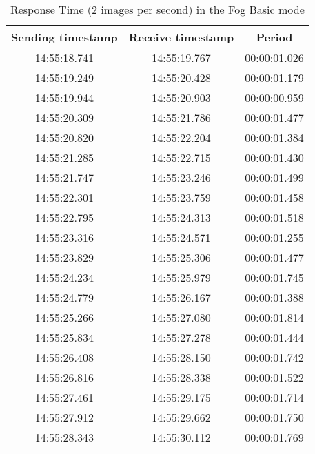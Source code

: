 \begin{table}[h!]
\centering
\begin{tabular}{ |c|c|c| } 
 \hline
 Sending timestamp &    Receive timestamp &    Period\\
 \hline

14:55:18.741 &	14:55:19.767 &	00:00:01.026 \\
14:55:19.249 &	14:55:20.428 &	00:00:01.179 \\
14:55:19.944 &	14:55:20.903 &	00:00:00.959 \\
14:55:20.309 &	14:55:21.786 &	00:00:01.477 \\
14:55:20.820 &	14:55:22.204 &	00:00:01.384 \\
14:55:21.285 &	14:55:22.715 &	00:00:01.430 \\
14:55:21.747 &	14:55:23.246 &	00:00:01.499 \\
14:55:22.301 &	14:55:23.759 &	00:00:01.458 \\
14:55:22.795 &	14:55:24.313 &	00:00:01.518 \\
14:55:23.316 &	14:55:24.571 &	00:00:01.255 \\
14:55:23.829 &	14:55:25.306 &	00:00:01.477 \\
14:55:24.234 &	14:55:25.979 &	00:00:01.745 \\
14:55:24.779 &	14:55:26.167 &	00:00:01.388 \\
14:55:25.266 &	14:55:27.080 &	00:00:01.814 \\
14:55:25.834 &	14:55:27.278 &	00:00:01.444 \\
14:55:26.408 &	14:55:28.150 &	00:00:01.742 \\
14:55:26.816 &	14:55:28.338 &	00:00:01.522 \\
14:55:27.461 &	14:55:29.175 &	00:00:01.714 \\
14:55:27.912 &	14:55:29.662 &	00:00:01.750 \\
14:55:28.343 &	14:55:30.112 &	00:00:01.769 \\
 \hline
\end{tabular}
\caption{Response Time (2 images per second) in the Fog Basic mode}
\label{table:measure_response_time_basic_0.5}
\end{table}

